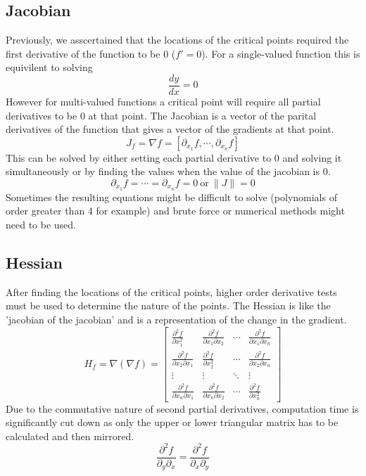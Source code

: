 \documentclass[10pt,a4paper]{report}
\begin{document}
			\subsection{Jacobian}
				Previously, we asscertained that the locations of the critical points required the first derivative of the function to be 0 ($f' = 0$).
				For a single-valued function this is equivilent to solving \[\frac{dy}{dx} = 0\]
				However for multi-valued functions a critical point will require all partial derivatives to be 0 at that point. The Jacobian \autocite{Jacobian} is
				a vector of the parital derivatives of the function that gives a vector of the gradients at that point.
				\begin{equation}
					J_f = \nabla f = [\partial_{x_1} f, \cdots, \partial_{x_n} f]
					\label{eq:jacobian}
				\end{equation}
				This can be solved by either setting each partial derivative to 0 and solving it simultaneously or by finding the values
				when the value of the jacobian is 0. \[\partial_{x_1} f = \cdots = \partial_{x_n} f = 0 \ \textrm{or} \ \| J \| = 0 \]
				Sometimes the resulting equations might be difficult to solve (polynomials of order greater than 4 for example) and brute force or numerical methods
				might need to be used.
			\subsection{Hessian}
				After finding the locations of the critical points, higher order derivative tests must be used to determine the nature of the points.
				The Hessian \autocite{Hessian} is like the 'jacobian of the jacobian' and is a representation of the change in the gradient.
				\begin{equation}
					H_f = \nabla(\nabla f) =
						\begin{bmatrix}
							\frac{\partial^2 f}{\partial x_{1}^{2}} & \frac{\partial^2 f}{\partial x_1 \partial x_2} &\cdots & \frac{\partial^2 f}{\partial x_1 \partial x_n}\\
							\frac{\partial^2 f}{\partial x_2 \partial x_1} & \frac{\partial^2 f}{\partial x_{2}^{2}} & \cdots & \frac{\partial^2 f}{\partial x_2 \partial x_n}\\
							\vdots & \vdots  & \ddots & \vdots \\
							\frac{\partial^2 f}{\partial x_n \partial x_1} & \frac{\partial^2 f}{\partial x_n \partial x_2} & \cdots & \frac{\partial^2 f}{\partial x_{n}^{2}}
						\end{bmatrix}
					\label{eq:hessian}
				\end{equation}
				Due to the commutative nature of second partial derivatives, computation time is significantly cut down as only the upper or lower
				triangular matrix has to be calculated and then mirrored.
				\begin{equation}
					\frac{\partial^2 f}{\partial_y \partial_x} = \frac{\partial^2 f}{\partial_x \partial_y}
					\label{eq:symmetry}
				\end{equation}
\end{document}
